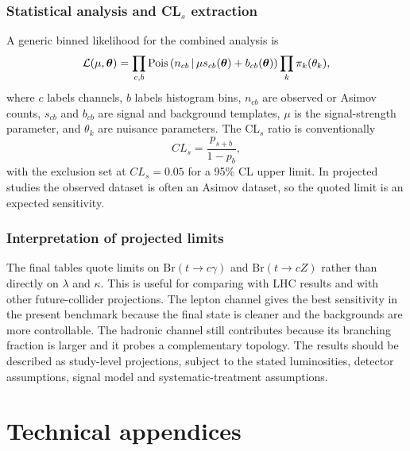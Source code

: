 \documentclass[11pt,a4paper]{report}
\newcommand{\br}{\mathrm{Br}}
\begin{document}
\section{Statistical analysis and CL$_s$ extraction}

A generic binned likelihood for the combined analysis is
\begin{equation}
  \mathcal L(\mu,\boldsymbol\theta)=\prod_{c,b}{\rm Pois}\left(n_{cb}\,\middle|\,\mu s_{cb}(\boldsymbol\theta)+b_{cb}(\boldsymbol\theta)\right)
  \prod_k\pi_k(\theta_k),
\end{equation}
where $c$ labels channels, $b$ labels histogram bins, $n_{cb}$ are observed or Asimov counts, $s_{cb}$ and $b_{cb}$ are signal and background templates, $\mu$ is the signal-strength parameter, and $\theta_k$ are nuisance parameters.  The CL$_s$ ratio is conventionally
\begin{equation}
  CL_s=\frac{p_{s+b}}{1-p_b},
\end{equation}
with the exclusion set at $CL_s=0.05$ for a 95\% CL upper limit.  In projected studies the observed dataset is often an Asimov dataset, so the quoted limit is an expected sensitivity.




\section{Interpretation of projected limits}

The final tables quote limits on $\br(t\to c\gamma)$ and $\br(t\to cZ)$ rather than directly on $\lambda$ and $\kappa$.  This is useful for comparing with LHC results and with other future-collider projections.  The lepton channel gives the best sensitivity in the present benchmark because the final state is cleaner and the backgrounds are more controllable.  The hadronic channel still contributes because its branching fraction is larger and it probes a complementary topology.  The results should be described as study-level projections, subject to the stated luminosities, detector assumptions, signal model and systematic-treatment assumptions.



\part{Technical appendices}
\appendix
\end{document}
